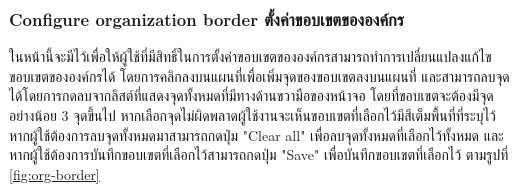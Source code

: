 \subsubsection{\ifenglish Configure organization border \else ตั้งค่าขอบเขตขององค์กร \fi}

\ifenglish \else 
ในหน้านี้จะมีไว้เพื่อให้ผู้ใช้ที่มีสิทธิ์ในการตั้งค่าขอบเขตขององค์กรสามารถทำการเปลี่ยนแปลงแก้ไขขอบเขตขององค์กรได้ โดยการคลิกลงบนแผนที่เพื่อเพิ่มจุดของขอบเขตลงบนแผนที่ และสามารถลบจุดได้โดยการกดลบจากลิสต์ที่แสดงจุดทั้งหมดที่มีทางด้านขวามือของหน้าจอ โดยที่ขอบเขตจะต้องมีจุดอย่างน้อย 3 จุดขึ้นไป หากเลือกจุดไม่ผิดพลาดผู้ใช้งานจะเห็นขอบเขตที่เลือกไว้มีสีเต็มพื้นที่ที่ระบุไว้ หากผู้ใช้ต้องการลบจุดทั้งหมดมาสามารถกดปุ่ม "Clear all" เพื่อลบจุดทั้งหมดที่เลือกไว้ทั้งหมด
และหากผู้ใช้ต้องการบันทึกขอบเขตที่เลือกไว้สามารถกดปุ่ม "Save" เพื่อบันทึกขอบเขตที่เลือกไว้ ตามรูปที่ \ref{fig:org-border}
\fi

